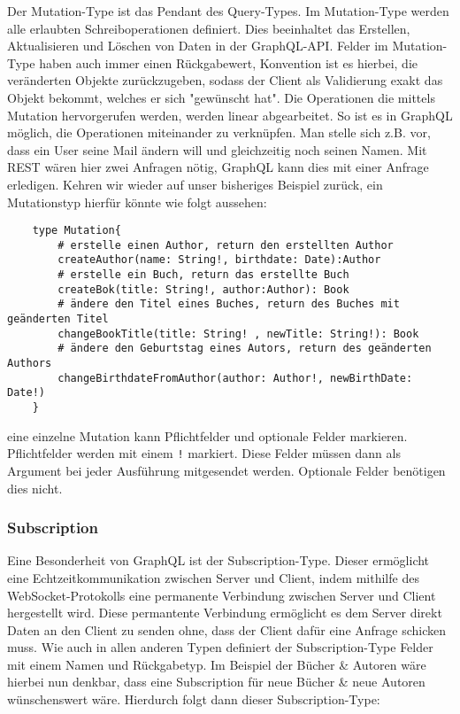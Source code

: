 Der Mutation-Type ist das Pendant des Query-Types. Im Mutation-Type werden alle erlaubten Schreiboperationen definiert.
Dies beeinhaltet das Erstellen, Aktualisieren und Löschen von Daten in der GraphQL-API.
Felder im Mutation-Type haben auch immer einen Rückgabewert, Konvention ist es hierbei, die veränderten Objekte zurückzugeben,
sodass der Client als Validierung exakt das Objekt bekommt, welches er sich "gewünscht hat".
Die Operationen die mittels Mutation hervorgerufen werden, werden linear abgearbeitet. So ist es in GraphQL möglich, die
Operationen miteinander zu verknüpfen. Man stelle sich z.B. vor, dass ein User seine Mail ändern will und gleichzeitig noch
seinen Namen. Mit REST wären hier zwei Anfragen nötig, GraphQL kann dies mit einer Anfrage erledigen.
Kehren wir wieder auf unser bisheriges Beispiel zurück, ein Mutationstyp hierfür könnte wie folgt aussehen:

\begin{verbatim}
    type Mutation{
        # erstelle einen Author, return den erstellten Author
        createAuthor(name: String!, birthdate: Date):Author
        # erstelle ein Buch, return das erstellte Buch
        createBok(title: String!, author:Author): Book
        # ändere den Titel eines Buches, return des Buches mit geänderten Titel
        changeBookTitle(title: String! , newTitle: String!): Book
        # ändere den Geburtstag eines Autors, return des geänderten Authors
        changeBirthdateFromAuthor(author: Author!, newBirthDate: Date!)
    }
\end{verbatim}

eine einzelne Mutation kann Pflichtfelder und optionale Felder markieren.
Pflichtfelder werden mit einem \verb+!+ markiert.
Diese Felder müssen dann als Argument bei jeder Ausführung mitgesendet werden.
Optionale Felder benötigen dies nicht.

\subsubsection{Subscription}

Eine Besonderheit von GraphQL ist der Subscription-Type.
Dieser ermöglicht eine Echtzeitkommunikation zwischen Server und Client, indem mithilfe des WebSocket-Protokolls eine
permanente Verbindung zwischen Server und Client hergestellt wird.
Diese permantente Verbindung ermöglicht es dem Server direkt Daten an den Client zu senden ohne, dass der Client dafür
eine Anfrage schicken muss.
Wie auch in allen anderen Typen definiert der Subscription-Type Felder mit einem Namen und Rückgabetyp.
Im Beispiel der Bücher & Autoren wäre hierbei nun denkbar, dass eine Subscription für neue Bücher & neue Autoren wünschenswert
wäre.
Hierdurch folgt dann dieser Subscription-Type:

